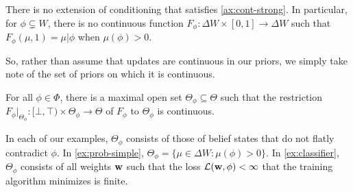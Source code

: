 %
\begin{prop}
	There is no extension of conditioning that satisfies \cref{ax:cont-strong}.
	In particular, 
	for $\phi\subsetneq W$,
	there is no continuous function
	$F_\phi : \Delta W \times [0,1] \to \Delta W$
	such that $F_\phi(\mu, 1) = \mu|\phi$ when $\mu(\phi) > 0$. 
\end{prop}
%
So, rather than assume that updates are continuous in our priors, we
simply take note of the set of priors on which it is continuous.

\begin{prop}
	For all $\phi \in \Phi$,
	there is a maximal open set $\Theta_\phi \subseteq \Theta$ such that
	the restriction $F_{\phi} |_{\Theta_\phi} : 
		[\bot,\!\top) \times \Theta_\phi \to \Theta
	$		
	of $F_\phi$ to $\Theta_\phi$ is continuous. 	
\end{prop}
In each of our examples, $\Theta_\phi$ consists of those
of belief states that do not flatly contradict $\phi$.
In \cref{ex:prob-simple}, $\Theta_\phi = \{ \mu \in \Delta W : \mu(\phi) > 0\}$.
In \cref{ex:classifier}, $\Theta_\phi$ consists of all weights $\mathbf{w}$ 
such that
the loss $\mathcal L(\mathbf{w}, \phi) < \infty$ that the training algorithm minimizes is finite.



